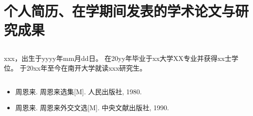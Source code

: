 

\chapter*{个人简历、在学期间发表的学术论文与研究成果}

\section*{}

{
\zihaowu
\setlength{\baselineskip}{16pt}
\setlength{\parskip}{0pt}

xxx，出生于yyyy年mm月dd日。
在20yy年毕业于xx大学XX专业并获得xx士学位。
于20xx年至今在南开大学就读xxx研究生。

}

\section*{}


\begin{itemize}
	\item 周恩来. 周恩来选集[M]. 人民出版社, 1980.
	\item 周恩来. 周恩来外交文选[M]. 中央文献出版社, 1990.
\end{itemize}




